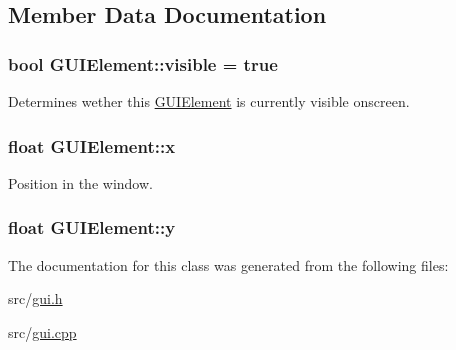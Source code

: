 \subsection{Member Data Documentation}
\hypertarget{class_g_u_i_element_a9385814f8643bdb096013a3846c2516b}{
\subsubsection[{visible}]{\setlength{\rightskip}{0pt plus 5cm}bool G\-U\-I\-Element\-::visible = true\hspace{0.3cm}{\ttfamily [protected]}}}\label{class_g_u_i_element_a9385814f8643bdb096013a3846c2516b}


Determines wether this \hyperlink{class_g_u_i_element}{G\-U\-I\-Element} is currently visible onscreen. 

\hypertarget{class_g_u_i_element_a7d5e8a612605a3ed7cfd11895a91e6ef}{
\subsubsection[{x}]{\setlength{\rightskip}{0pt plus 5cm}float G\-U\-I\-Element\-::x\hspace{0.3cm}{\ttfamily [protected]}}}\label{class_g_u_i_element_a7d5e8a612605a3ed7cfd11895a91e6ef}


Position in the window. 

\hypertarget{class_g_u_i_element_a9415b77e6e60981d2be4a39fdd873cf7}{
\subsubsection[{y}]{\setlength{\rightskip}{0pt plus 5cm}float G\-U\-I\-Element\-::y\hspace{0.3cm}{\ttfamily [protected]}}}\label{class_g_u_i_element_a9415b77e6e60981d2be4a39fdd873cf7}


The documentation for this class was generated from the following files\-:\begin{DoxyCompactItemize}
\item 
src/\hyperlink{gui_8h}{gui.\-h}\item 
src/\hyperlink{gui_8cpp}{gui.\-cpp}\end{DoxyCompactItemize}
